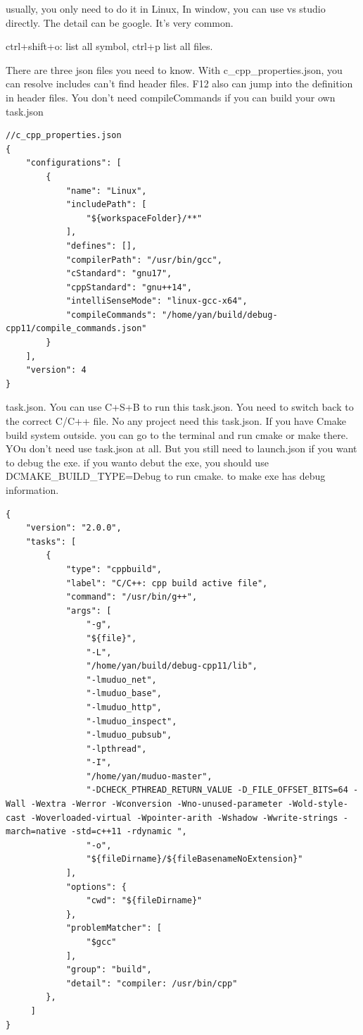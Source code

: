 \documentclass[paper=8.5in:11in, twoside, 12pt, pagesize=pdftex]{book}
\begin{document}
usually, you only need to do it in Linux, In window, you can use vs studio directly. The detail can be google. It's very common.

ctrl+shift+o: list all symbol, ctrl+p list all files.



There are three json files you need to know. With c\_cpp\_properties.json, you can resolve includes can't find header files. F12 also can jump into the definition in header files. You don't need compileCommands if you can build your own task.json
    
\begin{lstlisting}[mathescape=false]
//c_cpp_properties.json
{
    "configurations": [
        {
            "name": "Linux",
            "includePath": [
                "${workspaceFolder}/**"
            ],
            "defines": [],
            "compilerPath": "/usr/bin/gcc",
            "cStandard": "gnu17",
            "cppStandard": "gnu++14",
            "intelliSenseMode": "linux-gcc-x64",
            "compileCommands": "/home/yan/build/debug-cpp11/compile_commands.json"
        }
    ],
    "version": 4
}
\end{lstlisting}

task.json. You can use C+S+B to run this task.json. You need to switch back to the correct C/C++ file. No any project need this task.json. If you have Cmake build system outside. you can go to the terminal and run cmake or make there. YOu don't need use task.json at all.  But you still need to launch.json if you want to debug the exe. if you wanto debut the exe, you should use DCMAKE\_BUILD\_TYPE=Debug to run cmake. to make exe has debug information. 

\begin{lstlisting}[mathescape=false]
{
    "version": "2.0.0",
    "tasks": [
        {
            "type": "cppbuild",
            "label": "C/C++: cpp build active file",
            "command": "/usr/bin/g++",
            "args": [
                "-g",
                "${file}",
                "-L",
                "/home/yan/build/debug-cpp11/lib",
                "-lmuduo_net",
                "-lmuduo_base",
                "-lmuduo_http",
                "-lmuduo_inspect",
                "-lmuduo_pubsub",
                "-lpthread",
                "-I",
                "/home/yan/muduo-master",
                "-DCHECK_PTHREAD_RETURN_VALUE -D_FILE_OFFSET_BITS=64 -Wall -Wextra -Werror -Wconversion -Wno-unused-parameter -Wold-style-cast -Woverloaded-virtual -Wpointer-arith -Wshadow -Wwrite-strings -march=native -std=c++11 -rdynamic ",
                "-o",
                "${fileDirname}/${fileBasenameNoExtension}"
            ],
            "options": {
                "cwd": "${fileDirname}"
            },
            "problemMatcher": [
                "$gcc"
            ],
            "group": "build",
            "detail": "compiler: /usr/bin/cpp"
        },
     ]
}
\end{lstlisting}
\end{document}
